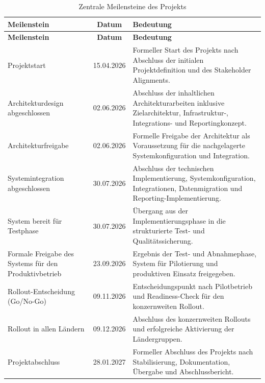 \begin{xltabular}{\textwidth}{@{}>{\hsize}Xc>{\hsize}X@{}}
    \caption{Zentrale Meilensteine des Projekts} \label{tab:meilensteine} \\
    \toprule
    \textbf{Meilenstein} & \textbf{Datum} & \textbf{Bedeutung} \\
    \midrule
    \endfirsthead

    \toprule
    \textbf{Meilenstein} & \textbf{Datum} & \textbf{Bedeutung} \\
    \midrule
    \endhead

    \bottomrule
    \endfoot

    Projektstart                                          & 15.04.2026     & Formeller Start des Projekts nach Abschluss der initialen Projektdefinition und des Stakeholder Alignments.                   \\
    Architekturdesign abgeschlossen                       & 02.06.2026     & Abschluss der inhaltlichen Architekturarbeiten inklusive Zielarchitektur, Infrastruktur-, Integrations- und Reportingkonzept. \\
    Architekturfreigabe                                   & 02.06.2026     & Formelle Freigabe der Architektur als Voraussetzung für die nachgelagerte Systemkonfiguration und Integration.                \\
    Systemintegration abgeschlossen                       & 30.07.2026     & Abschluss der technischen Implementierung, Systemkonfiguration, Integrationen, Datenmigration und Reporting-Implementierung.  \\
    System bereit für Testphase                           & 30.07.2026     & Übergang aus der Implementierungsphase in die strukturierte Test- und Qualitätssicherung.                                     \\
    Formale Freigabe des Systems für den Produktivbetrieb & 23.09.2026     & Ergebnis der Test- und Abnahmephase, System für Pilotierung und produktiven Einsatz freigegeben.                      \\
    Rollout-Entscheidung (Go/No-Go)                       & 09.11.2026     & Entscheidungspunkt nach Pilotbetrieb und Readiness-Check für den konzernweiten Rollout.                                       \\
    Rollout in allen Ländern                              & 09.12.2026     & Abschluss des konzernweiten Rollouts und erfolgreiche Aktivierung der Ländergruppen.                                          \\
    Projektabschluss                                      & 28.01.2027     & Formeller Abschluss des Projekts nach Stabilisierung, Dokumentation, Übergabe und Abschlussbericht.                           \\
\end{xltabular}

